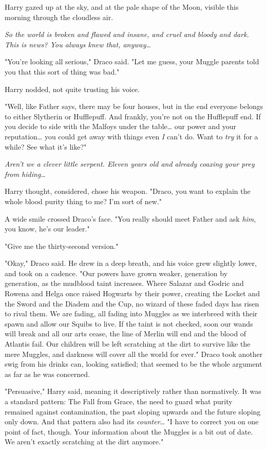 Harry gazed up at the sky, and at the pale shape of the Moon, visible this 
morning through the cloudless air.

\emph{So the world is broken and flawed and insane, and cruel and bloody and 
dark. This is news? You always knew that, anyway{\ldots}}

"You're looking all serious," Draco said. "Let me guess, your Muggle parents 
told you that this sort of thing was bad."

Harry nodded, not quite trusting his voice.

"Well, like Father says, there may be four houses, but in the end everyone 
belongs to either Slytherin or Hufflepuff. And frankly, you're not on the 
Hufflepuff end. If you decide to side with the Malfoys under the table{\ldots} 
our power and your reputation{\ldots} you could get away with things even 
\emph{I} can't do. Want to \emph{try} it for a while? See what it's like?"

\emph{Aren't we a clever little serpent. Eleven years old and already coaxing 
your prey from hiding{\ldots}}

Harry thought, considered, chose his weapon. "Draco, you want to explain the 
whole blood purity thing to me? I'm sort of new."

A wide smile crossed Draco's face. "You really should meet Father and ask 
\emph{him}, you know, he's our leader."

"Give me the thirty-second version."

"Okay," Draco said. He drew in a deep breath, and his voice grew slightly 
lower, and took on a cadence. "Our powers have grown weaker, generation by 
generation, as the mudblood taint increases. Where Salazar and Godric and 
Rowena and Helga once raised Hogwarts by their power, creating the Locket and 
the Sword and the Diadem and the Cup, no wizard of these faded days has risen 
to rival them. We are fading, all fading into Muggles as we interbreed with 
their spawn and allow our Squibs to live. If the taint is not checked, soon our 
wands will break and all our arts cease, the line of Merlin will end and the 
blood of Atlantis fail. Our children will be left scratching at the dirt to 
survive like the mere Muggles, and darkness will cover all the world for ever." 
Draco took another swig from his drinks can, looking satisfied; that seemed to 
be the whole argument as far as he was concerned.

"Persuasive," Harry said, meaning it descriptively rather than normatively. It 
was a standard pattern: The Fall from Grace, the need to guard what purity 
remained against contamination, the past sloping upwards and the future sloping 
only down. And that pattern also had its \emph{counter}{\ldots} "I have to 
correct you on one point of fact, though. Your information about the Muggles is 
a bit out of date. We aren't exactly scratching at the dirt anymore."

